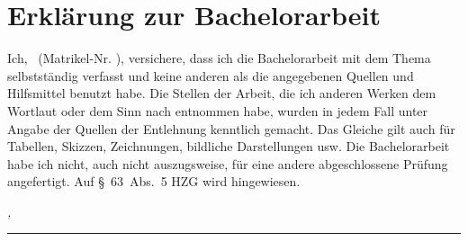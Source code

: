 %
\chapter*{Erklärung zur Bachelorarbeit}
\label{sec:declaration}
\thispagestyle{empty}

Ich, \thesisName\ (Matrikel-Nr. \thesisMatNr), versichere, dass ich die Bachelorarbeit mit dem Thema \textit{\thesisTitle} selbstständig verfasst und keine anderen als die angegebenen Quellen und Hilfsmittel benutzt habe.
Die Stellen der Arbeit, die ich anderen Werken dem Wortlaut oder dem Sinn nach entnommen habe, wurden in jedem Fall unter Angabe der Quellen der Entlehnung kenntlich gemacht.
Das Gleiche gilt auch für Tabellen, Skizzen, Zeichnungen, bildliche Darstellungen usw.
Die Bachelorarbeit habe ich nicht, auch nicht auszugsweise, für eine andere abgeschlossene Prüfung angefertigt.
Auf §~63~Abs.~5 HZG wird hingewiesen.

\bigskip

\noindent\textit{\thesisUniversityCity, \thesisDate}

\smallskip

\begin{flushright}
	\begin{minipage}{7cm}
		\rule{\textwidth}{1pt}
		\centering\thesisName\
	\end{minipage}
\end{flushright}


